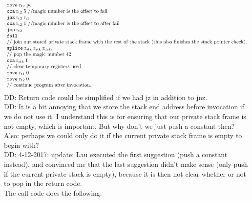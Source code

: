 \documentclass[a3paper]{article}
\newcommand\dominique[1]{{\color{purple} \sf \footnotesize {DD: #1}}\\}
\newcommand{\targetcolor}[1]{\color{black}}
\newcommand{\trg}[1]{{\targetcolor{} #1}}
\newcommand{\zinstr}[1]{\texttt{#1}}
\newcommand{\oneinstr}[2]{
  \ifthenelse{\equal{#2}{}}
  {\zinstr{#1}}
  {\zinstr{#1} \; #2}
}
\newcommand{\twoinstr}[3]{
  \ifthenelse{\equal{#2#3}{}}
  {\zinstr{#1}}
  {\zinstr{#1} \; #2 \; #3}
}
\newcommand{\threeinstr}[4]{
  \ifthenelse{\equal{#2#3#4}{}}
  {\zinstr{#1}}
  {\zinstr{#1} \; #2 \; #3 \; #4}
}
\newcommand{\tfail}{\zinstr{\trg{fail}}}
\newcommand{\tjmp}[1]{\oneinstr{\trg{jmp}}{#1}}
\newcommand{\tjnz}[2]{\twoinstr{\trg{jnz}}{#1}{#2}}
\newcommand{\tmove}[2]{\twoinstr{\trg{move}}{#1}{#2}}
\newcommand{\tcca}[2]{\twoinstr{\trg{cca}}{#1}{#2}}
\newcommand{\tsplice}[3]{\threeinstr{\trg{splice}}{#1}{#2}{#3}}
\newcommand{\pcreg}{\mathrm{pc}}
\newcommand{\rstk}{\mathrm{r}_\mathrm{stk}}
\newcommand{\rdata}{\mathrm{r}_\mathrm{data}}
\newcommand{\rtmp}[1]{\mathrm{r}_\mathrm{t#1}}
\begin{document}
\[\begin{array}{l}
    \tmove{\rtmp{2}}{\pcreg}\\
    \tcca{\rtmp{2}}{5} \text{ //magic number is the offset to fail} \\
    \tjnz{\rtmp{2}}{\rtmp{1}} \\
    \tcca{\rtmp{2}}{1} \text{ //magic number is the offset to after fail} \\
    \tjmp{\rtmp{2}} \\
    \tfail \\
    \text{// join our stored private stack frame with the rest of the stack (this also finishes the stack pointer check).}\\
    \tsplice{\rstk}{\rstk}{\rdata} \\
    \text{// pop the magic number 42}\\
    \tcca{\rstk}{1}\\
    \text{// clear temporary registers used}\\
    \tmove{\rtmp{1}}{0}\\
    \tmove{\rtmp{2}}{0}\\
    \text{// continue program after invocation.}
  \end{array}
\]
\dominique{Return code could be simplified if we had jz in addition to jnz.}
\dominique{It is a bit annoying that we store the stack end address before invocation if we do not use it.
  I understand this is for ensuring that our private stack frame is not empty, which is important.
  But why don't we just push a constant then?
  Also: perhaps we could only do it if the current private stack frame is empty to begin with?
}
\dominique{4-12-2017: update: Lau executed the first suggestion (push a constant instead), and convinced me that the last suggestion didn't make sense (only push if the current private stack is empty), because it is then not clear whether or not to pop in the return code.}
The call code does the following:
\end{document}
